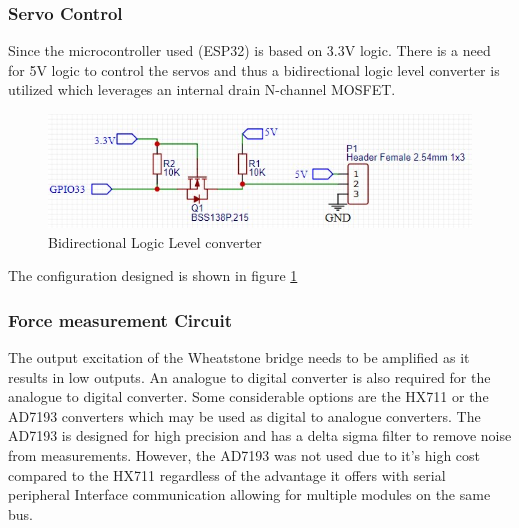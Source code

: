\subsubsection{Servo Control}
Since the microcontroller used (ESP32) is based on 3.3V logic. There is a need for 5V logic to control the servos and thus a bidirectional logic level converter is utilized which leverages an internal drain N-channel MOSFET.
\begin{center}
	\begin{figure}[H]
		\centering
		\includegraphics{Figures/logik}
		\caption[Bidirectional Logic Level converter]{Bidirectional Logic Level converter}
		\label{fig:logik}
	\end{figure}
\end{center}
The configuration designed is shown in figure \ref{fig:logik}

\subsubsection{Force measurement Circuit}

The output excitation of the Wheatstone bridge needs to be amplified as it results in low outputs. An analogue to digital converter is also required for the analogue to digital converter. Some considerable options are the HX711 or the AD7193 converters which may be used as digital to analogue converters. The AD7193 is designed for high precision and has a delta sigma filter to remove noise from measurements.  However, the AD7193 was not used due to it's high cost compared to the HX711 regardless of the advantage it offers with serial peripheral Interface communication allowing for multiple modules on the same bus.

